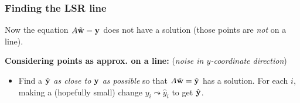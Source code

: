 \documentclass{beamer}
\theoremstyle{example}
\begin{document}
\begin{frame}
\frametitle{Finding the LSR line}
Now the equation $A\tilde{\bf w} = {\bf y}$ does not have a solution (those points are \emph{not} on a line). 

\textbf{Considering points as approx. on a line:} (\emph{noise in $y$-coordinate direction}) 
\begin{itemize}
    \item Find a $\hat{\bf y}$ \emph{as close to} ${\bf y}$ \emph{as possible} so that $A\tilde{\bf w} = \hat{\bf y}$ has a solution. For each $i$, making a (hopefully small) change $y_i \leadsto \hat{y}_i$ to get $\hat{\bf y}$.
\end{itemize}

\begin{multicols}{2}

\end{multicols}

\end{frame}
\end{document}
